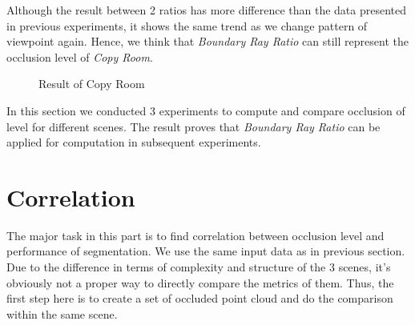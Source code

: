 \documentclass[11pt, a4paper,oneside,chapterprefix=false]{scrbook}
\begin{document}
Although the result between 2 ratios has more difference than the data presented in previous experiments, it shows the same trend as we change pattern of viewpoint again. Hence, we think that \textit{Boundary Ray Ratio} can still represent the occlusion level of \textit{Copy Room}. 

\begin{figure}[H]
    \centering
    \caption{Result of Copy Room}
    \label{fig:result of copy room}
\end{figure}

In this section we conducted 3 experiments to compute and compare occlusion of level for different scenes. The result proves that \textit{Boundary Ray Ratio} can be applied for computation in subsequent experiments.

\section{Correlation}

The major task in this part is to find correlation between occlusion level and performance of segmentation. We use the same input data as in previous section. Due to the difference in terms of complexity and structure of the 3 scenes, it's obviously not a proper way to directly compare the metrics of them. Thus, the first step here is to create a set of occluded point cloud and do the comparison within the same scene.
\end{document}
